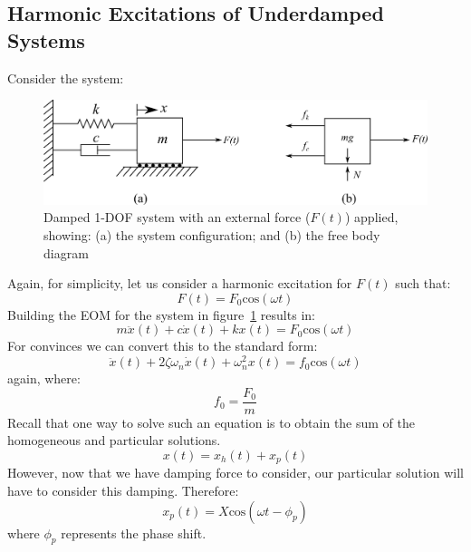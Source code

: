 \documentclass[12pt,letter]{article}
\begin{document}
\subsection{Harmonic Excitations of Underdamped Systems}

	Consider the system:
	\begin{figure}[H]
		\centering
		\includegraphics[]{../figures/1-DOF-spring_dashpot_mass_horizontal_forced_FBD.png}
		\caption{Damped 1-DOF system with an external force ($F(t)$) applied, showing: (a) the system configuration; and (b) the free body diagram}
		\label{fig:1-DOF-spring_dashpot_mass_horizontal_forced_FBD}
	\end{figure}	
	\noindent Again, for simplicity, let us consider a harmonic excitation for $F(t)$ such that:
	\begin{equation}
		F(t) = F_0\text{cos}(\omega t)
	\end{equation}							
	Building the EOM for the system in figure~\ref{fig:1-DOF-spring_dashpot_mass_horizontal_forced_FBD} results in:
	\begin{equation}
		m \ddot{x}(t)+c\dot{x}(t)+kx(t) = F_0\text{cos}(\omega t)
	\end{equation}			
	For convinces we can convert this to the standard form:					
	\begin{equation}
		\ddot{x}(t)+2 \zeta \omega_n \dot{x}(t) +\omega_n^2x(t) = f_0\text{cos}(\omega t)
	\end{equation}					
	again, where:
	\begin{equation}
		f_0 = \frac{F_0}{m}
	\end{equation}	
	Recall that one way to solve such an equation is to obtain the sum of the homogeneous and particular solutions. 
	\begin{equation}
		x(t) = x_h(t) + x_p(t)
	\end{equation}	
	However, now that we have damping force to consider, our particular solution will have to consider this damping. Therefore:
	\begin{equation}
		\label{eq:x_p(t)}
		x_p(t) = X \text{cos}(\omega t - \phi_p)
	\end{equation}
	where $\phi_p$ represents the phase shift. 
\end{document}
